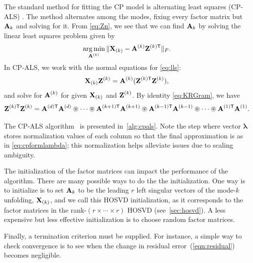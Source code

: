 The standard method for fitting the CP model is alternating least
squares (CP-ALS) \cite{PARAFAC,Kolda:2009}. The method alternates
among the modes, fixing every factor matrix but $\Mn{A}{k}$ and
solving for it. From \cref{eq:Zn}, 
we see that we can find $\Mn{A}{k}$ by solving the linear least squares
problem given by
\begin{equation}
\label{eq:lls}
\argmin_{\M{A}^{(k)}} \|\M{X}_{(k)} - \M{A}^{(k)}\M{Z}^{(k)\trans}\|_F.
\end{equation}
In CP-ALS, we work with the normal equations for \cref{eq:lls}:
\begin{displaymath}
\M{X}_{(k)}\M{Z}^{(k)} = \M{A}^{(k)}(\M{Z}^{(k)\trans}\M{Z}^{(k)}),
\end{displaymath}
and solve for $\M{A}^{(k)}$ for given $\M{X}_{(k)}$ and $\M{Z}^{(k)}$.
By identity \cref{eq:KRGram}, we have 
\begin{equation}
\label{eqn:nicegram}
\M{Z}^{(k)\trans}\M{Z}^{(k)} = \M{A}^{(d)\trans}\M{A}^{(d)} \circledast \dots \circledast \M{A}^{(k+1)\trans}\M{A}^{(k+1)} \circledast \M{A}^{(k-1)\trans}\M{A}^{(k-1)} \circledast \cdots \circledast \M{A}^{(1)\trans}\M{A}^{(1)}.
\end{equation}

The CP-ALS algorithm~\cite{Kolda:2009} is presented
in~\cref{alg:cpals}. Note the step where vector $\bm{\lambda}$ stores
normalization values of each column so that the final approximation is
as in \cref{eq:cpformlambda}; this normalization helps alleviate
issues due to scaling ambiguity.

The initialization of the factor matrices
can impact the performance of the algorithm.
There are many possible ways to do the the initialization.
One way is to
initialize is to set $\Mn{A}{k}$ to be the leading $r$ left singular
vectors of the mode-$k$ unfolding, $\M{X}_{(k)}$, and we call this
HOSVD initialization, as it corresponds to the factor matrices
in the rank-$(r{\times} {\cdots} {\times} r)$ HOSVD (see~\cref{sec:hosvd}). 
A less expensive but less effective initialization is to
choose random factor matrices.

Finally, a termination criterion must be supplied. For instance, a simple way to check convergence is to see when the change in residual error~(\cref{eqn:residual}) becomes negligible.

